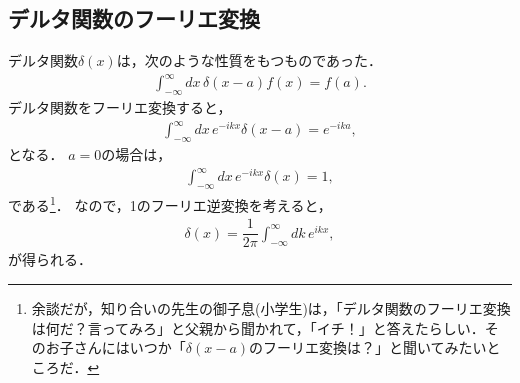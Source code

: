 \subsection{デルタ関数のフーリエ変換}
%
デルタ関数$\delta(x)$は，次のような性質をもつものであった．
\begin{align}
 \int_{-\infty}^{\infty}dx\,\delta\left(x-a\right)f\left(x\right) = f\left(a\right). 
\end{align}
%
デルタ関数をフーリエ変換すると，
\begin{align}
 \int_{-\infty}^{\infty}dx\,e^{-ikx}\delta\left(x-a\right) = e^{-ika},
\end{align}
となる．
%
$a=0$の場合は，
\begin{align}
 \int_{-\infty}^{\infty}dx\,e^{-ikx}\delta\left(x\right) = 1, 
\end{align}
である\footnote{余談だが，知り合いの先生の御子息(小学生)は，「デルタ関数のフーリエ変換は何だ？言ってみろ」と父親から聞かれて，「イチ！」と答えたらしい．そのお子さんにはいつか「$\delta(x-a)$のフーリエ変換は？」と聞いてみたいところだ．}．
%
なので，1のフーリエ逆変換を考えると，
\begin{align}
 \delta\left(x\right) = \dfrac{1}{2\pi}\int_{-\infty}^{\infty}dk\,e^{ikx}, \label{deltafunc_fourier} 
\end{align}
が得られる．
%
